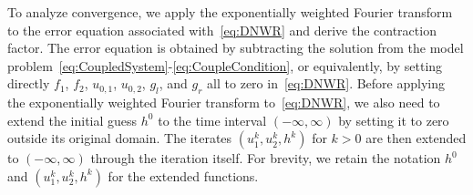 \documentclass[10pt,a4paper]{amsart}
\begin{document}
To analyze convergence, we apply the exponentially weighted Fourier transform to the error equation associated with~\eqref{eq:DNWR} and derive the contraction factor. The error equation is obtained by subtracting the solution from the model problem~\eqref{eq:CoupledSystem}-\eqref{eq:CoupleCondition}, or equivalently, by setting directly $f_1$, $f_2$, $u_{0,1}$, $u_{0,2}$, $g_l$, and $g_r$ all to zero in~\eqref{eq:DNWR}. Before applying the exponentially weighted Fourier transform to~\eqref{eq:DNWR}, we also need to extend the initial guess $h^0$ to the time interval $(-\infty, \infty)$ by setting it to zero outside its original domain. The iterates $(u_1^k, u_2^k, h^k)$ for $k>0$ are then extended to $(-\infty,\infty)$ through the iteration itself. For brevity, we retain the notation $h^0$ and $(u_1^k, u_2^k, h^k)$ for the extended functions. 
\end{document}
